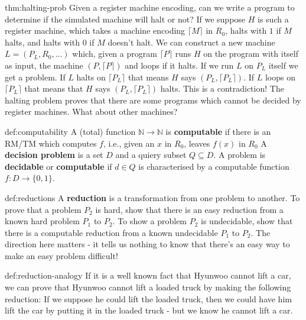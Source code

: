 \documentclass[landscape, 8pt]{extarticle}
\begin{document}
\begin{multicols}{3}
\begin{thm}{thm:halting-prob}{}
Given a register machine encoding, can we write a program to determine if the simulated machine will halt or not? \newline
If we suppose $H$ is such a register machine, which takes a machine encoding $\lceil M \rceil$ in $R_{0}$, halts with $1$ if $M$ halts, and halts with $0$ if $M$ doesn't halt. \newline
We can construct a new machine $L = (P_{L}, R_{0},\dots)$ which, given a program $\lceil P \rceil $ runs $H$ on the program with itself as input, the machine $(P, \lceil P \rceil )$ and loops if it halts. \newline
If we run $L$ on $P_{L}$ itself we get a problem. If $L$ halts on $\lceil P_{L} \rceil $ that means $H$ says $(P_{L}, \lceil P_{L} \rceil )$. If $L$ loops on $\lceil P_{L} \rceil $ that means that $H$ says $(P_{L}, \lceil P_{L} \rceil )$ halts.\newline
This is a contradiction! \newline
The halting problem proves that there are some programs which cannot be decided by register machines. What about other machines?
\end{thm}

\begin{dfn}[Computability]{def:computability}{}
A (total) function $\mathbb{N}\to\mathbb{N}$ is \textbf{computable} if there is an RM/TM which computes $f$, i.e., given an $x$ in $R_{0}$, leaves $f(x)$ in $R_{0}$\newline
A \textbf{decision problem} is a set $D$ and a quiery subset $Q\subseteq D$. A problem is \textbf{decidable} or \textbf{computable} if $d\in Q$ is characterised by a computable function $f : D\to \{0, 1\}$.
\end{dfn}


\begin{dfn}[Reductions]{def:reductions}{}
A \textbf{reduction} is a transformation from one problem to another. To prove that a problem $P_{2}$ is hard, show that there is an easy reduction from a known hard problem $P_{1}$ to $P_{2}$.\newline
To show a problem $P_{2}$ is undecidable, show that there is a computable reduction from a known undecidable $P_{1}$ to $P_{2}$. The direction here matters - it tells us nothing to know that there's an easy way to make an easy problem difficult!
\end{dfn}

\begin{xmp}{def:reduction-analogy}{}
If it is a well known fact that Hyunwoo cannot lift a car, we can prove that
Hyunwoo cannot lift a loaded truck by making the following reduction: If we
suppose he could lift the loaded truck, then we could have him lift the car by
putting it in the loaded truck - but we know he cannot lift a car.
\end{xmp}



\end{multicols}
\end{document}
